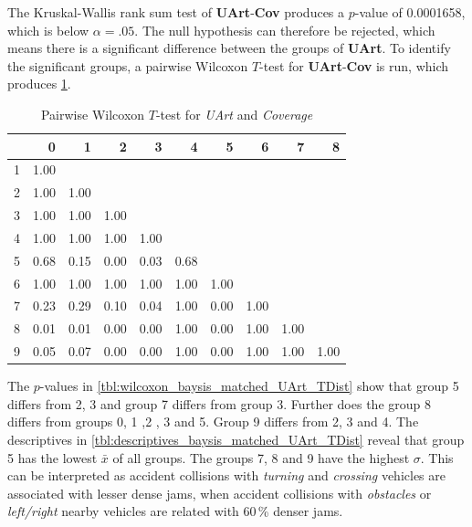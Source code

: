 The Kruskal-Wallis rank sum test of \textbf{UArt}-\textbf{Cov} produces a $p$-value of 0.0001658, which is below $\alpha=.05$. The null hypothesis can therefore be rejected, which means there is a significant difference between the groups of \textbf{UArt}. To identify the significant groups, a pairwise Wilcoxon $T$-test for \textbf{UArt}-\textbf{Cov} is run, which produces \cref{tbl:wilcoxon_baysis_matched_UArt_Cov}.
\begin{table}[ht]
	\small
	\centering
	\begin{tabular}{rrrrrrrrrr}
		\toprule
		& 0 & 1 & 2 & 3 & 4 & 5 & 6 & 7 & 8 \\ 
		\midrule
		1 & 1.00 &  &  &  &  &  &  &  &  \\ 
		2 & 1.00 & 1.00 &  &  &  &  &  &  &  \\ 
		3 & 1.00 & 1.00 & 1.00 &  &  &  &  &  &  \\ 
		4 & 1.00 & 1.00 & 1.00 & 1.00 &  &  &  &  &  \\ 
		5 & 0.68 & 0.15 & 0.00 & 0.03 & 0.68 &  &  &  &  \\ 
		6 & 1.00 & 1.00 & 1.00 & 1.00 & 1.00 & 1.00 &  &  &  \\ 
		7 & 0.23 & 0.29 & 0.10 & 0.04 & 1.00 & 0.00 & 1.00 &  &  \\ 
		8 & 0.01 & 0.01 & 0.00 & 0.00 & 1.00 & 0.00 & 1.00 & 1.00 &  \\ 
		9 & 0.05 & 0.07 & 0.00 & 0.00 & 1.00 & 0.00 & 1.00 & 1.00 & 1.00 \\ 
		\bottomrule
	\end{tabular}
	\caption{Pairwise Wilcoxon $T$-test for \textit{UArt} and \textit{Coverage}}
	\label{tbl:wilcoxon_baysis_matched_UArt_Cov}
\end{table}
The $p$-values in \cref{tbl:wilcoxon_baysis_matched_UArt_TDist} show that group 5 differs from 2, 3 and group 7 differs from group 3. Further does the group 8 differs from groups 0, 1 ,2 , 3 and 5. Group 9 differs from 2, 3 and 4. The descriptives in \cref{tbl:descriptives_baysis_matched_UArt_TDist} reveal that group 5 has the lowest $\bar{x}$ of all groups. The groups 7, 8 and 9 have the highest $\sigma$. This can be interpreted as accident collisions with \textit{turning} and \textit{crossing} vehicles are associated with lesser dense jams, when accident collisions with \textit{obstacles} or \textit{left/right} nearby vehicles are related with 60\,\% denser jams.
